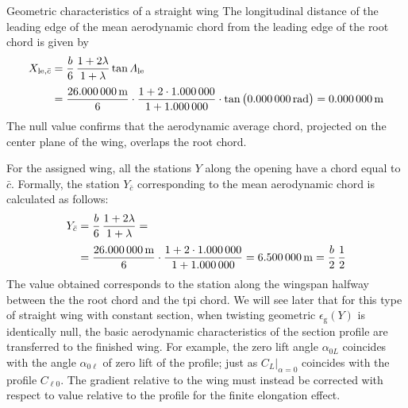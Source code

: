 \documentclass[[12pt,twoside]{book}
\begin{document}
\begin{myExampleX}{Geometric characteristics of a straight wing}{}
\noindent
The longitudinal distance of the leading edge of the mean aerodynamic chord from the
leading edge of the root chord is given by
\[
\begin{split}
X_{\mathrm{le},\bar{c}} 
  & {}=
    \frac{b}{6} \, \frac{1+2\lambda}{1+\lambda} \tan\Lambda_\mathrm{le} \\[3pt]
  & {}=
    \frac{\SI[round-precision=1]{\mySpanWingMT}{\metre}}{6}
      \cdot 
      \frac{
        1 + 2\cdot\SI[round-precision=0]{\myTaperRatioWing}{}
      }{
        1 + \SI[round-precision=0]{\myTaperRatioWing}{}
      }
      \cdot \tan \big( \SI[round-precision=0]{\myLambdaLERad}{\radian} \big)
    = { \SI[round-precision=0]{\myXLEMACWingMT}{\metre} }%
\end{split}
\]
The null value confirms that the aerodynamic average chord, projected on the center plane
of the wing, overlaps the root chord.

\noindent
For the assigned wing, all the stations $ Y $ along the opening have a chord equal to $ \bar{c} $.
Formally, the station $ Y _ {\bar{c}} $ corresponding to the mean aerodynamic chord
is calculated as follows:
\[
\begin{split}
Y_{\bar{c}} 
  & {}=
    \frac{b}{6} \, \frac{1+2\lambda}{1+\lambda} = \\[3pt]
  & {}=
    \frac{\SI[round-precision=1]{\mySpanWingMT}{\metre}}{6}
      \cdot 
      \frac{
        1 + 2\cdot\SI[round-precision=2]{\myTaperRatioWing}{}
      }{
        1 + \SI[round-precision=2]{\myTaperRatioWing}{}
      }
    = { \SI[round-precision=2]{\myYMACWingMT}{\metre} }
    = \frac{b}{2} \, \frac{1}{2}
\end{split}
\]
The value obtained corresponds to the station along the wingspan halfway between the
the root chord and the tpi chord.
We will see later that for this type of straight wing with constant section, when twisting
geometric $ \epsilon_\mathrm {g} (Y) $ is identically null,
the basic aerodynamic characteristics of the section profile are transferred to the finished wing.
For example, the zero lift angle $\alpha_ {0L} $ coincides with the angle $ \alpha_ {0 \ell} $
of zero lift of the profile; just as $C_L \big|_{\alpha = 0} $ coincides with the profile $ C _ {\ell 0} $.
The gradient  relative to the wing must instead be corrected with respect to
 value relative to the profile for the finite elongation effect.

\end{myExampleX}
\end{document}

